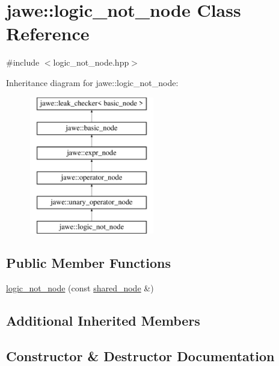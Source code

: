 \hypertarget{classjawe_1_1logic__not__node}{}\section{jawe\+:\+:logic\+\_\+not\+\_\+node Class Reference}
\label{classjawe_1_1logic__not__node}


{\ttfamily \#include $<$logic\+\_\+not\+\_\+node.\+hpp$>$}

Inheritance diagram for jawe\+:\+:logic\+\_\+not\+\_\+node\+:\begin{figure}[H]
\begin{center}
\leavevmode
\includegraphics[height=6.000000cm]{classjawe_1_1logic__not__node}
\end{center}
\end{figure}
\subsection*{Public Member Functions}
\begin{DoxyCompactItemize}
\item 
\hyperlink{classjawe_1_1logic__not__node_a1b2483edad7696849d7ce64793f6ba9d}{logic\+\_\+not\+\_\+node} (const \hyperlink{namespacejawe_a3f307481d921b6cbb50cc8511fc2b544}{shared\+\_\+node} \&)
\end{DoxyCompactItemize}
\subsection*{Additional Inherited Members}


\subsection{Constructor \& Destructor Documentation}
\mbox{\label{classjawe_1_1logic__not__node_a1b2483edad7696849d7ce64793f6ba9d}} 
